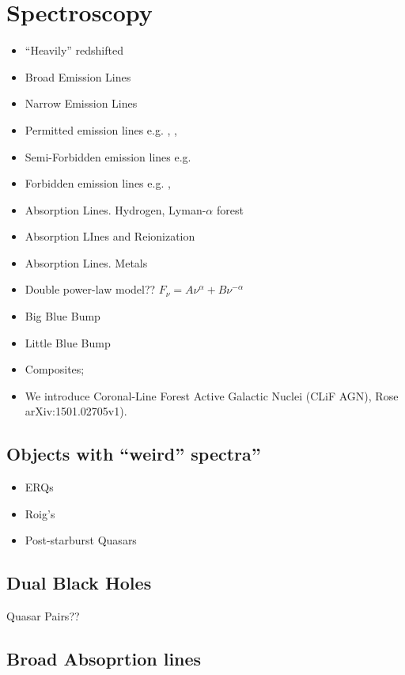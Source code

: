 \documentclass[usenatbib]{mn2e}
\begin{document}
\section{Spectroscopy} %
\begin{itemize}
    \item{``Heavily'' redshifted}
    \item{Broad Emission Lines}
    \item{Narrow Emission Lines}
    \item{Permitted emission lines e.g. \lya, \civ, \mgii }
    \item{Semi-Forbidden emission lines e.g. \ciii } 
    \item{Forbidden emission lines e.g. \oiii, \nev } 
    \item{Absorption Lines. Hydrogen, Lyman-$\alpha$ forest}
    \item{Absorption LInes and Reionization}
    \item{Absorption Lines. Metals}
      \item{Double power-law model?? $F_{\nu} = A \nu^{\alpha} + B \nu^{-\alpha}$  \citet{Kishimoto08}}
\item{Big Blue Bump}
\item{Little Blue Bump}
  \item{Composites; \cite{Francis91, VdB01}}
    \item{We introduce Coronal-Line Forest Active Galactic Nuclei (CLiF AGN), Rose arXiv:1501.02705v1).}
\end{itemize}
    \subsection{Objects with ``weird'' spectra''}
    \begin{itemize}
      \item{ERQs}
      \item{Roig's}
        \item{Post-starburst Quasars}
    \end{itemize}



     \subsection{Dual Black Holes}
     Quasar Pairs??

     \subsection{Broad Absoprtion lines}
     
\end{document}
